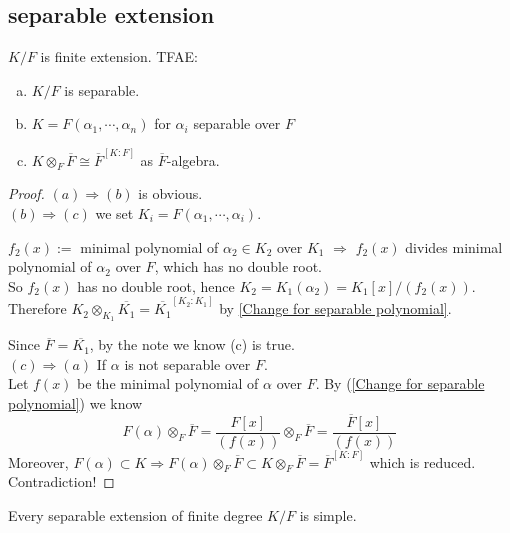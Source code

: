 \subsection{separable extension}
\begin{theorem}
     $ K/F  $ is finite extension. TFAE:
     \begin{enumerate}[(a)]
         \item $ K/F  $ is separable.
          \item $ K=F(\alpha_1,\cdots,\alpha_n) $ for  $ \alpha_i  $ separable over  $ F  $
        \item  $ K\otimes _F \overline{F}\cong \overline{F}^{[K:F]} $ as  $ \overline{F} $-algebra.  
     \end{enumerate}
\end{theorem}
\begin{proof}
     $ (a)\Rightarrow (b) $ is obvious.\\
      $ (b)\Rightarrow (c) $ we set  $ K_i=F(\alpha_1,\cdots,\alpha_i) $.\\
      \begin{note}
         $ f_2(x):=  $ minimal polynomial of  $ \alpha_2\in K_2 $ over  $ K_1 $ $ \Rightarrow  $  $ f_2(x)  $ divides minimal polynomial of  $ \alpha_2  $ over  $ F  $, which has no double root.\\
         So  $ f_2(x)  $ has no double root, hence  $ K_2=K_1(\alpha_2)=K_1[x]/(f_2(x)) $.\\
         Therefore  $ K_2\otimes_{K_1}\overline{K_1}=\overline{K_1}^{[K_2:K_1]} $ by \ref{Change for separable polynomial}.    
      \end{note}
      Since  $ \overline{F}=\overline{K_1} $, by the note we know (c) is true.\\
       $ (c)\Rightarrow (a) $ If  $ \alpha  $ is not separable over  $ F  $.\\
       Let  $ f(x)  $ be the minimal polynomial of  $ \alpha $ over  $ F  $. By (\ref{Change for separable polynomial}) we know 
       \[F(\alpha)\otimes_F\overline{F}=\frac{F[x]}{(f(x))}\otimes_F \overline{F}=\frac{\overline{F}[x]}{(f(x))}\]
       Moreover,  $ F(\alpha)\subset K \Rightarrow F(\alpha)\otimes_F\overline{F}\subset K\otimes_F \overline{F}=\overline{F}^{[K:F]} $ which is reduced. Contradiction!  
       
\end{proof}
\begin{theorem}
    Every separable extension of finite degree $ K/F  $ is simple.
\end{theorem}

